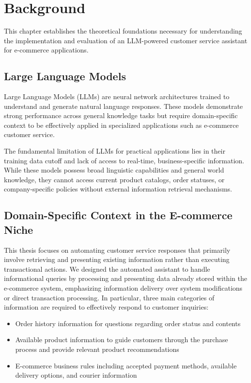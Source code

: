 \chapter{Background}
\label{cha:background}

This chapter establishes the theoretical foundations necessary for understanding the implementation and evaluation of an LLM-powered customer service assistant for e-commerce applications.

\section{Large Language Models}

Large Language Models (LLMs) are neural network architectures trained to understand and generate natural language responses.
These models demonstrate strong performance across general knowledge tasks but require domain-specific context to be effectively applied in specialized applications such as e-commerce customer service.

The fundamental limitation of LLMs for practical applications lies in their training data cutoff and lack of access to real-time, business-specific information.
While these models possess broad linguistic capabilities and general world knowledge, they cannot access current product catalogs, order statuses, or company-specific policies without external information retrieval mechanisms.

\section{Domain-Specific Context in the E-commerce Niche}

This thesis focuses on automating customer service responses that primarily involve retrieving and presenting existing information rather than executing transactional actions.
We designed the automated assistant to handle informational queries by processing and presenting data already stored within the e-commerce system, emphasizing information delivery over system modifications or direct transaction processing.
In particular, three main categories of information are required to effectively respond to customer inquiries:
\begin{itemize}
    \item Order history information for questions regarding order status and contents
    \item Available product information to guide customers through the purchase process and provide relevant product recommendations
    \item E-commerce business rules including accepted payment methods, available delivery options, and courier information
\end{itemize}

